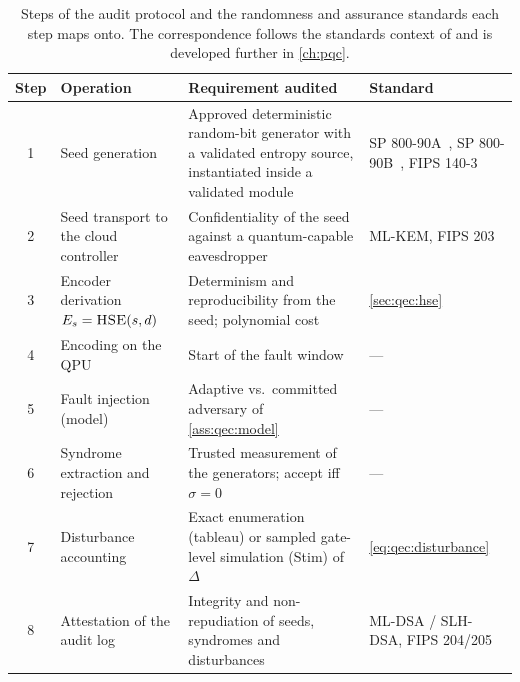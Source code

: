 \begin{table}[htbp]
\caption{Steps of the audit protocol and the randomness and assurance standards each step maps onto. The correspondence follows the standards context of \cite{guo2026qecaudit} and is developed further in \cref{ch:pqc}.}
\label{tab:qec:protocol}
\centering\footnotesize
\begin{tabularx}{\textwidth}{@{}c p{2.9cm} X p{3.9cm}@{}}
\toprule
Step & Operation & Requirement audited & Standard \\
\midrule
1 & Seed generation & Approved deterministic random-bit generator with a validated entropy source, instantiated inside a validated module & SP 800-90A~\cite{nist2015sp80090a}, SP 800-90B~\cite{nist2018sp80090b}, FIPS 140-3~\cite{nist2019fips1403} \\
2 & Seed transport to the cloud controller & Confidentiality of the seed against a quantum-capable eavesdropper & ML-KEM, FIPS 203~\cite{nist2024fips203} \\
3 & Encoder derivation $E_s=\textsc{HSE}(s,d)$ & Determinism and reproducibility from the seed; polynomial cost & \cref{sec:qec:hse} \\
4 & Encoding on the QPU & Start of the fault window & --- \\
5 & Fault injection (model) & Adaptive vs.\ committed adversary of \cref{ass:qec:model} & --- \\
6 & Syndrome extraction and rejection & Trusted measurement of the generators; accept iff $\sigma=0$ & --- \\
7 & Disturbance accounting & Exact enumeration (tableau) or sampled gate-level simulation (Stim) of $\Delta$ & \cref{eq:qec:disturbance} \\
8 & Attestation of the audit log & Integrity and non-repudiation of seeds, syndromes and disturbances & ML-DSA / SLH-DSA, FIPS 204/205~\cite{nist2024fips204,nist2024fips205} \\
\bottomrule
\end{tabularx}
\end{table}


